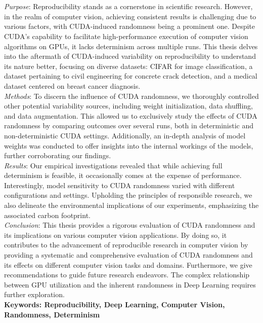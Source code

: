 \chapter{\abstractname}


\textit{Purpose}: Reproducibility stands as a cornerstone in scientific research. However, in the realm of computer vision, achieving consistent results is challenging due to various factors, with CUDA-induced randomness being a prominent one. Despite CUDA's capability to facilitate high-performance execution of computer vision algorithms on GPUs, it lacks determinism across multiple runs. This thesis delves into the aftermath of CUDA-induced variability on reproducibility to understand its nature better, focusing on diverse datasets: CIFAR for image classification, a dataset pertaining to civil engineering for concrete crack detection, and a medical dataset centered on breast cancer diagnosis.\\

\textit{Methods}: To discern the influence of CUDA randomness, we thoroughly controlled other potential variability sources, including weight initialization, data shuffling, and data augmentation. This allowed us to exclusively study the effects of CUDA randomness by comparing outcomes over several runs, both in deterministic and non-deterministic CUDA settings. Additionally, an in-depth analysis of model weights was conducted to offer insights into the internal workings of the models, further corroborating our findings.\\

\textit{Results}: Our empirical investigations revealed that while achieving full determinism is feasible, it occasionally comes at the expense of performance. Interestingly, model sensitivity to CUDA randomness varied with different configurations and settings. Upholding the principles of responsible research, we also delineate the environmental implications of our experiments, emphasizing the associated carbon footprint.\\

\textit{Conclusion}: This thesis provides a rigorous evaluation of CUDA randomness and its implications on various computer vision applications. By doing so, it contributes to the advancement of reproducible research in computer vision by providing a systematic and comprehensive evaluation of CUDA randomness and its effects on different computer vision tasks and domains. Furthermore, we give recommendations to guide future research endeavors. The complex relationship between GPU utilization and the inherent randomness in Deep Learning requires further exploration.\\

\textbf{Keywords: Reproducibility, Deep Learning, Computer Vision, Randomness, Determinism}